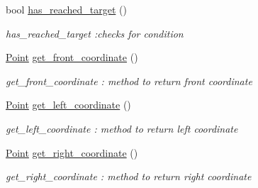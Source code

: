 \begin{DoxyCompactItemize}
bool \hyperlink{classSteeringControl_a31b1c0fe098911c1001b3c77fa65fa96}{has\+\_\+reached\+\_\+target} ()
\begin{DoxyCompactList}\small\item\em has\+\_\+reached\+\_\+target \+:checks for condition \end{DoxyCompactList}\item 
\hyperlink{classPoint}{Point} \hyperlink{classSteeringControl_a0fdca7f565d9484877850f8be65e02cc}{get\+\_\+front\+\_\+coordinate} ()
\begin{DoxyCompactList}\small\item\em get\+\_\+front\+\_\+coordinate \+: method to return front coordinate \end{DoxyCompactList}\item 
\hyperlink{classPoint}{Point} \hyperlink{classSteeringControl_a78ca3cc603867ed714dce5b792365b43}{get\+\_\+left\+\_\+coordinate} ()
\begin{DoxyCompactList}\small\item\em get\+\_\+left\+\_\+coordinate \+: method to return left coordinate \end{DoxyCompactList}\item 
\hyperlink{classPoint}{Point} \hyperlink{classSteeringControl_a5778ab49477993b2e2b586630ca08410}{get\+\_\+right\+\_\+coordinate} ()
\begin{DoxyCompactList}\small\item\em get\+\_\+right\+\_\+coordinate \+: method to return right coordinate \end{DoxyCompactList}\end{DoxyCompactItemize}

